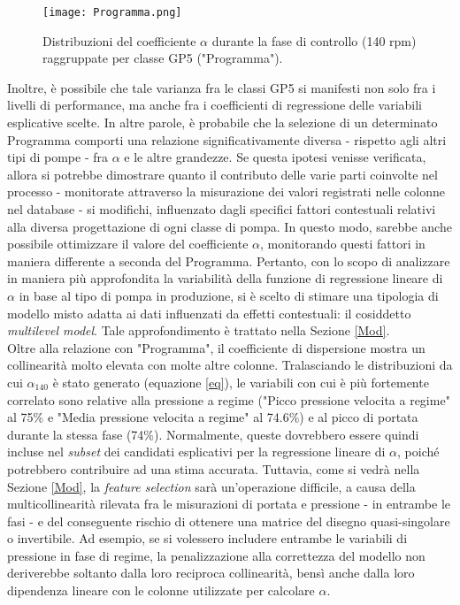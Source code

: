 \documentclass[fleqn,10pt]{SelfArx} %
\begin{document}
\begin{figure}[h]
    \centering
    \texttt{[image: Programma.png]}
    \label{fig:em}
    \caption{Distribuzioni del coefficiente $\alpha$ durante la fase di controllo (140 rpm) raggruppate per classe GP5 ("Programma").}
\end{figure}
Inoltre, è possibile che tale varianza fra le classi GP5 si manifesti non solo fra i livelli di performance, ma anche fra i coefficienti di regressione delle variabili esplicative scelte. In altre parole, è probabile che la selezione di un determinato Programma comporti una relazione significativamente diversa - rispetto agli altri tipi di pompe - fra $\alpha$ e le altre grandezze. Se questa ipotesi venisse verificata, allora si potrebbe dimostrare quanto il contributo delle varie parti coinvolte nel processo - monitorate attraverso la misurazione dei valori registrati nelle colonne nel database - si modifichi, influenzato dagli specifici fattori contestuali relativi alla diversa progettazione di ogni classe di pompa. In questo modo, sarebbe anche possibile ottimizzare il valore del coefficiente $\alpha$, monitorando questi fattori in maniera differente a seconda del Programma. Pertanto, con lo scopo di analizzare in maniera più approfondita la variabilità della funzione di regressione lineare di $\alpha$ in base al tipo di pompa in produzione, si è scelto di stimare una tipologia di modello misto adatta ai dati influenzati da effetti contestuali: il cosiddetto \textit{multilevel model}. Tale approfondimento è trattato nella Sezione \ref{Mod}.\\
Oltre alla relazione con "Programma", il coefficiente di dispersione mostra un collinearità molto elevata con molte altre colonne. Tralasciando le distribuzioni da cui $\alpha_{140}$ è stato generato (equazione \ref{eq}), le variabili con cui è più fortemente correlato sono relative alla pressione a regime ("Picco pressione velocita a regime" al 75\% e "Media pressione velocita a regime" al 74.6\%) e al picco di portata durante la stessa fase (74\%). Normalmente, queste dovrebbero essere quindi incluse nel \textit{subset} dei candidati esplicativi per la regressione lineare di $\alpha$, poiché potrebbero contribuire ad una stima accurata. Tuttavia, come si vedrà nella Sezione \ref{Mod}, la \textit{feature selection} sarà un'operazione difficile, a causa della multicollinearità rilevata fra le misurazioni di portata e pressione - in entrambe le fasi - e del conseguente rischio di ottenere una matrice del disegno quasi-singolare o invertibile. Ad esempio, se si volessero includere entrambe le variabili di pressione in fase di regime, la penalizzazione alla correttezza del modello non deriverebbe soltanto dalla loro reciproca collinearità, bensì anche dalla loro dipendenza lineare con le colonne utilizzate per calcolare $\alpha$.\\
\end{document}
